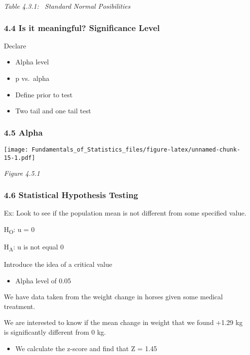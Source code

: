 \documentclass[]{article}
\providecommand{\tightlist}{%
  \setlength{\itemsep}{0pt}\setlength{\parskip}{0pt}}
\begin{document}
\emph{Table 4.3.1: ~Standard Normal Posibilities}

\hypertarget{is-it-meaningful-significance-level}{%
\subsubsection{4.4 Is it meaningful? Significance
Level}\label{is-it-meaningful-significance-level}}

Declare

\begin{itemize}
\tightlist
\item
  Alpha level
\item
  p vs.~alpha
\item
  Define prior to test
\item
  Two tail and one tail test
\end{itemize}

\hypertarget{alpha}{%
\subsubsection{4.5 Alpha}\label{alpha}}

\texttt{[image: Fundamentals\_of\_Statistics\_files/figure-latex/unnamed-chunk-15-1.pdf]}

\emph{Figure 4.5.1}

\hypertarget{statistical-hypothesis-testing-1}{%
\subsubsection{4.6 Statistical Hypothesis
Testing}\label{statistical-hypothesis-testing-1}}

Ex: Look to see if the population mean is not different from some
specified value.

H\textsubscript{O}: u = 0

H\textsubscript{A}: u is not equal 0

Introduce the idea of a critical value

\begin{itemize}
\tightlist
\item
  Alpha level of 0.05
\end{itemize}

We have data taken from the weight change in horses given some medical
treatment.

We are interested to know if the mean change in weight that we found
+1.29 kg is significantly different from 0 kg.

\begin{itemize}
\tightlist
\item
  We calculate the z-score and find that Z = 1.45
\end{itemize}
\end{document}
